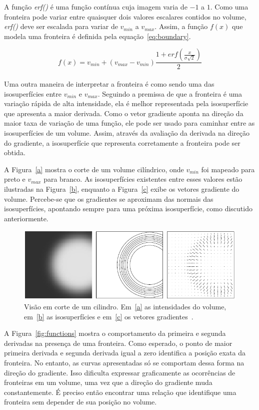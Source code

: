 	A função \textit{erf()} é uma função contínua cuja imagem varia de $-1$ a $1$. Como uma fronteira pode variar entre quaisquer dois valores escalares contidos no volume, \textit{erf()} deve ser escalada para variar de $v_{min}$ a $v_{max}$. Assim, a função $f(x)$ que modela uma fronteira é definida pela equação~\eqref{eq:boundary}.

\begin{equation} \label{eq:boundary}
	f(x) = v_{min} + (v_{max} - v_{min}) \frac{1 + erf(\frac{x}{\sigma\sqrt{2}})}{2}
\end{equation} \\

	Uma outra maneira de interpretar a fronteira é como sendo uma das isosuperfícies entre $v_{min}$ e $v_{max}$. Seguindo a premissa de que a fronteira é uma variação rápida de alta intensidade, ela é melhor representada pela isosuperfície que apresenta a maior derivada. Como o vetor gradiente aponta na direção da maior taxa de variação de uma função, ele pode ser usado para caminhar entre as isosuperfícies de um volume. Assim, através da avaliação da derivada na direção do gradiente, a isosuperfície que representa corretamente a fronteira pode ser obtida.
	
	A Figura~\ref{a} mostra o corte de um volume cilíndrico, onde $v_{min}$ foi mapeado para preto e $v_{max}$ para branco. As isosuperfícies existentes entre esses valores estão ilustradas na Figura~\ref{b}, enquanto a Figura~\ref{c} exibe os vetores gradiente do volume. Percebe-se que os gradientes se aproximam das normais das isosuperfícies, apontando sempre para uma próxima isosuperfície, como discutido anteriormente.
	
\begin{figure}[h]
	\centering
	\includegraphics[width=1\textwidth]{images/grad}
	\caption{Visão em corte de um cilindro. Em~\ref{a} as intensidades do volume, em~\ref{b} as isosuperfícies e em~\ref{c} os vetores gradientes~\cite{gordon}.}
	\label{fig:grad}
\end{figure}
	
	A Figura~\ref{fig:functions} mostra o comportamento da primeira e segunda derivadas na presença de uma fronteira. Como esperado, o ponto de maior primeira derivada e segunda derivada igual a zero identifica a posição exata da fronteira. No entanto, as curvas apresentadas só se comportam dessa forma na direção do gradiente. Isso dificulta expressar graficamente as ocorrências de fronteiras em um volume, uma vez que a direção do gradiente muda constantemente. É preciso então encontrar uma relação que identifique uma fronteira sem depender de sua posição no volume. 
	
